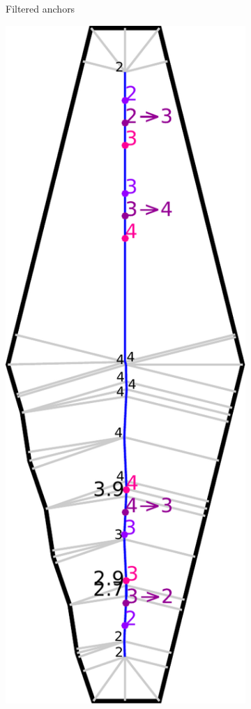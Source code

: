 \begin{figure}
\begin{subfigure}{\figwidth}
\caption{Filtered anchors}\label{beading_transitioning_filtering__filtered}
\end{subfigure}
\begin{subfigure}{\figwidth}
\includegraphics[width=\columnwidth]{sources-method-beading-transitioning-filtering--transition-ends.pdf}

\end{subfigure}
\end{figure}
